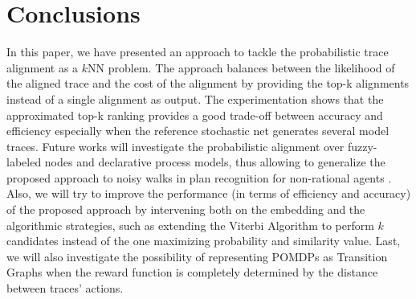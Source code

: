 
\section{Conclusions}
\label{sec:conclusion}

In this paper, we have presented an approach to tackle the probabilistic trace alignment as a $k$NN problem.
The approach balances between the likelihood of the aligned trace and the cost of the alignment by providing the top-k alignments instead of a single alignment as output. The experimentation shows that the approximated top-k ranking provides a good trade-off between accuracy and efficiency especially when the reference stochastic net generates several model traces.
Future works will investigate the probabilistic alignment over fuzzy-labeled nodes and declarative process models, thus allowing to generalize the proposed approach to noisy walks in plan recognition for non-rational agents \cite{RamirezG10}. Also, we will try to improve the performance (in terms of efficiency and accuracy) of the proposed approach by intervening both on the embedding and the algorithmic strategies, such as extending the Viterbi Algorithm  to perform $k$ candidates instead of the one maximizing probability and similarity value. Last, we will also investigate the possibility of representing POMDPs as Transition Graphs when the reward function is completely determined by the distance between traces' actions.

